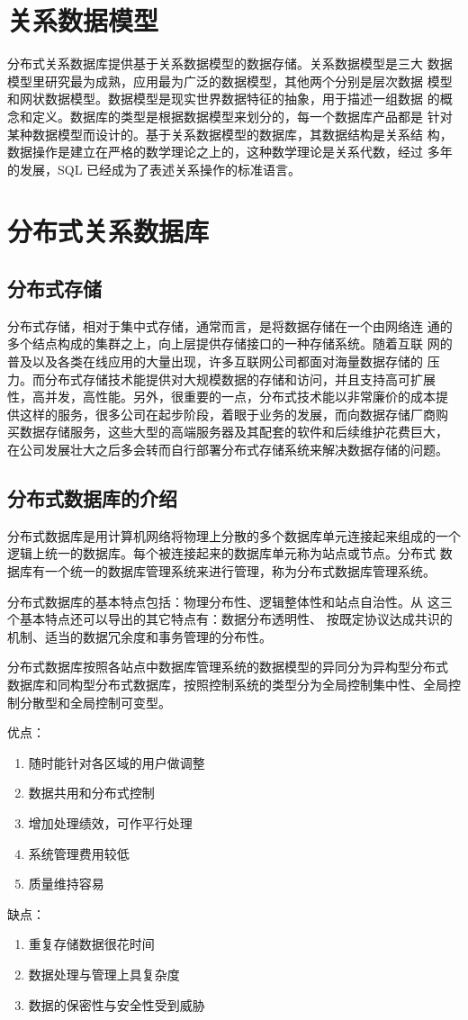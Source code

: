 \section{关系数据模型}
分布式关系数据库提供基于关系数据模型的数据存储。关系数据模型是三大
数据模型里研究最为成熟，应用最为广泛的数据模型，其他两个分别是层次数据
模型和网状数据模型。数据模型是现实世界数据特征的抽象，用于描述一组数据
的概念和定义。数据库的类型是根据数据模型来划分的，每一个数据库产品都是
针对某种数据模型而设计的。基于关系数据模型的数据库，其数据结构是关系结
构，数据操作是建立在严格的数学理论之上的，这种数学理论是关系代数，经过
多年的发展，SQL 已经成为了表述关系操作的标准语言。
\section{分布式关系数据库}
\subsection{分布式存储}
分布式存储，相对于集中式存储，通常而言，是将数据存储在一个由网络连
通的多个结点构成的集群之上，向上层提供存储接口的一种存储系统。随着互联
网的普及以及各类在线应用的大量出现，许多互联网公司都面对海量数据存储的
压力。而分布式存储技术能提供对大规模数据的存储和访问，并且支持高可扩展
性，高并发，高性能。另外，很重要的一点，分布式技术能以非常廉价的成本提
供这样的服务，很多公司在起步阶段，着眼于业务的发展，而向数据存储厂商购
买数据存储服务，这些大型的高端服务器及其配套的软件和后续维护花费巨大，
在公司发展壮大之后多会转而自行部署分布式存储系统来解决数据存储的问题。
\subsection{分布式数据库的介绍}
分布式数据库是用计算机网络将物理上分散的多个数据库单元连接起来组成的一个
逻辑上统一的数据库。每个被连接起来的数据库单元称为站点或节点。分布式
数据库有一个统一的数据库管理系统来进行管理，称为分布式数据库管理系统。

分布式数据库的基本特点包括：物理分布性、逻辑整体性和站点自治性。从
这三个基本特点还可以导出的其它特点有：数据分布透明性、
按既定协议达成共识的机制、适当的数据冗余度和事务管理的分布性。

分布式数据库按照各站点中数据库管理系统的数据模型的异同分为异构型分布式
数据库和同构型分布式数据库，按照控制系统的类型分为全局控制集中性、全局控制分散型和全局控制可变型。

\noindent
优点：
\begin{enumerate}
\item 随时能针对各区域的用户做调整
\item 数据共用和分布式控制
\item 增加处理绩效，可作平行处理
\item 系统管理费用较低
\item 质量维持容易
\end{enumerate}
缺点：
\begin{enumerate}
\item 重复存储数据很花时间
\item 数据处理与管理上具复杂度
\item 数据的保密性与安全性受到威胁
\end{enumerate}
